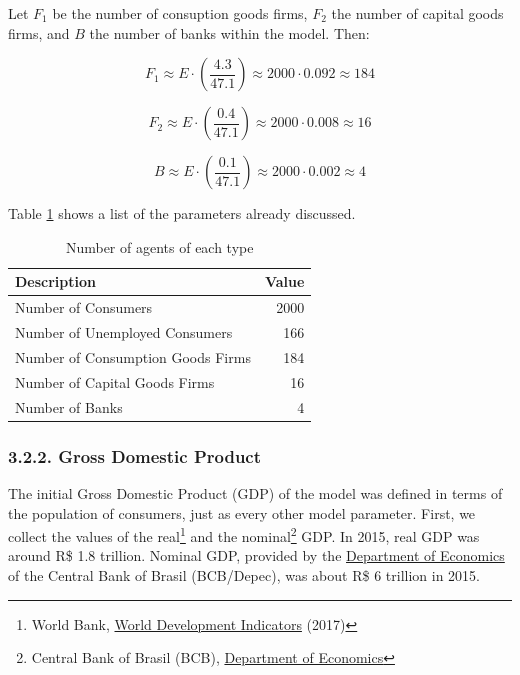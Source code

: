 \documentclass[11pt,]{article}
\begin{document}
Let \(F_1\) be the number of consuption goods firms, \(F_2\) the number
of capital goods firms, and \(B\) the number of banks within the model.
Then:

\begin{equation}
F_1 \approx E\cdot\left(\frac{4.3}{47.1}\right) \approx 2000\cdot 0.092 \approx 184
\end{equation}

\begin{equation}
F_2 \approx E\cdot \left(\frac{0.4}{47.1}\right) \approx 2000\cdot 0.008 \approx 16
\end{equation}

\begin{equation}
B \approx E\cdot \left(\frac{0.1}{47.1}\right) \approx 2000\cdot 0.002 \approx 4
\end{equation}

Table \ref{tab:agents} shows a list of the parameters already discussed.

\begin{table}

\caption{\label{tab:unnamed-chunk-7}\label{tab:agents}Number of agents of each type}
\centering
\begin{tabular}[t]{lr}
\toprule
Description & Value\\
\midrule
Number of Consumers & 2000\\
Number of Unemployed Consumers & 166\\
Number of Consumption Goods Firms & 184\\
Number of Capital Goods Firms & 16\\
Number of Banks & 4\\
\bottomrule
\end{tabular}
\end{table}

\subsubsection{3.2.2. Gross Domestic
Product}\label{gross-domestic-product}

The initial Gross Domestic Product (GDP) of the model was defined in
terms of the population of consumers, just as every other model
parameter. First, we collect the values of the real\footnote{World Bank,
  \href{http://databank.worldbank.org/data/reports.aspx?source=2\&series=NY.GDP.MKTP.KD.ZG\&country=BRA\#}{World
  Development Indicators} (2017)} and the nominal\footnote{Central Bank
  of Brasil (BCB),
  \href{http://www.bcb.gov.br/pec/Indeco/Port/indeco.asp}{Department of
  Economics}} GDP. In 2015, real GDP was around R\$ 1.8 trillion.
Nominal GDP, provided by the
\href{http://www.bcb.gov.br/pec/Indeco/Port/indeco.asp}{Department of
Economics} of the Central Bank of Brasil (BCB/Depec), was about R\$ 6
trillion in 2015.
\end{document}
